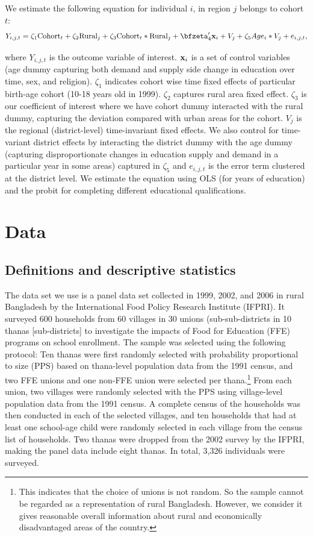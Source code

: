 \documentclass[12pt,letterpaper]{article}
\newcommand{\bfx}{\ensuremath{\mbox{\bf x}}}
\newcommand{\0}{\ensuremath{\mbox{\boldmath $0$}}}
\begin{document}
We estimate the following equation for individual $i$, in region $j$ belongs to cohort $t$:
\begin{equation}
Y_{i,j,t} = \zeta_{1}\textnormal{Cohort}_{t}+
\zeta_{2}\textnormal{Rural}_{j}+ \zeta_{3}\textnormal{Cohort}_{t}*\textnormal{Rural}_{j}+
\bfzeta'_{4}\bfx_{i}+V_{j}+\zeta_{5}Age_{i}*{V}_{j}+e_{i,j,t},
\label{longruneqn}
\end{equation}

where $Y_{i,j,t}$ is the outcome variable of interest. $\bfx_{i}$ is a set of control variables (age dummy capturing both demand and supply side change in education over time, sex, and religion). $\zeta_{1}$ indicates cohort wise time fixed effects of particular birth-age cohort (10-18 years old in 1999). $\zeta_{2}$ captures rural area fixed effect. $\zeta_{3}$ is our coefficient of interest where we have cohort dummy interacted with the rural dummy, capturing the deviation compared with urban areas for the cohort. $V_{j}$ is the regional (district-level) time-invariant fixed effects.  We also control for time-variant district effects by interacting the district dummy with the age dummy (capturing disproportionate changes in education supply and demand in a particular year in some areas) captured in $\zeta_{5}$ and $e_{i,j,t}$ is the error term clustered at the district level. We estimate the equation using OLS (for years of education) and the probit for completing different educational qualifications. 


\section{Data} 
\subsection{Definitions and descriptive statistics}

The data set we use is a panel data set collected in 1999, 2002, and 2006 in rural Bangladesh by the International Food Policy Research Institute (IFPRI). It surveyed 600 households from 60 villages in 30 unions (sub-sub-districts in 10 thanas [sub-districts] to investigate the impacts of Food for Education (FFE) programs on school enrollment. The sample was selected using the following protocol: Ten thanas were first randomly selected with probability proportional to size (PPS) based on thana-level population data from the 1991 census, and two FFE unions and one non-FFE union were selected per thana.\footnote{This indicates that the choice of unions is not random. So the sample cannot be regarded as a representation of rural Bangladesh. However, we consider it gives reasonable overall information about rural and economically disadvantaged areas of the country.  } From each union, two villages were randomly selected with the PPS using village-level population data from the 1991 census. A complete census of the households was then conducted in each of the selected villages, and ten households that had at least one school-age child were randomly selected in each village from the census list of households. Two thanas were dropped from the 2002 survey by the IFPRI, making the panel data include eight thanas. In total, 3,326 individuals were surveyed. 
\end{document}
